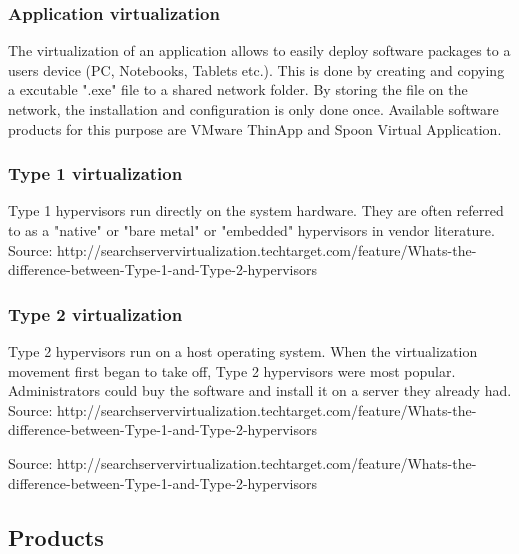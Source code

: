 \subsubsection{Application virtualization}

The virtualization of an application allows to easily deploy software packages to a users device (PC, Notebooks, Tablets etc.). This is done by creating and copying a excutable ".exe" file to a shared network folder. By storing the file on the network, the installation and configuration is only done once. Available software products for this purpose are VMware ThinApp and Spoon Virtual Application.

\subsubsection{Type 1 virtualization}

Type 1 hypervisors run directly on the system hardware. They are often referred to as a "native" or "bare metal" or "embedded" hypervisors in vendor literature.
\\
Source: http://searchservervirtualization.techtarget.com/feature/Whats-the-difference-between-Type-1-and-Type-2-hypervisors

\subsubsection{Type 2 virtualization}

Type 2 hypervisors run on a host operating system. When the virtualization movement first began to take off, Type 2 hypervisors were most popular. Administrators could buy the software and install it on a server they already had.
\\
Source: http://searchservervirtualization.techtarget.com/feature/Whats-the-difference-between-Type-1-and-Type-2-hypervisors

Source: http://searchservervirtualization.techtarget.com/feature/Whats-the-difference-between-Type-1-and-Type-2-hypervisors

\subsection{Products}

